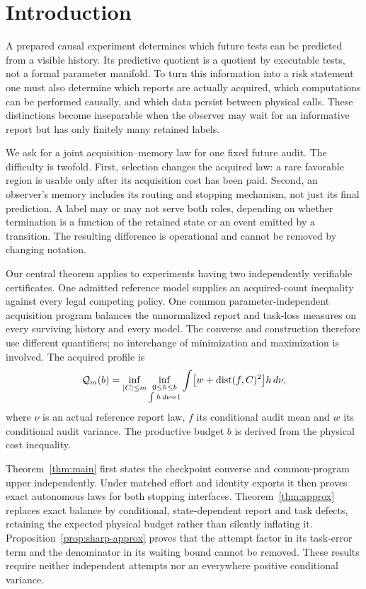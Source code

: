 \section{Introduction}
A prepared causal experiment determines which future tests can be predicted from a visible history. Its predictive quotient is a quotient by executable tests, not a formal parameter manifold. To turn this information into a risk statement one must also determine which reports are actually acquired, which computations can be performed causally, and which data persist between physical calls. These distinctions become inseparable when the observer may wait for an informative report but has only finitely many retained labels.

We ask for a joint acquisition--memory law for one fixed future audit. The difficulty is twofold. First, selection changes the acquired law: a rare favorable region is usable only after its acquisition cost has been paid. Second, an observer's memory includes its routing and stopping mechanism, not just its final prediction. A label may or may not serve both roles, depending on whether termination is a function of the retained state or an event emitted by a transition. The resulting difference is operational and cannot be removed by changing notation.

Our central theorem applies to experiments having two independently verifiable certificates. One admitted reference model supplies an acquired-count inequality against every legal competing policy. One common parameter-independent acquisition program balances the unnormalized report and task-loss measures on every surviving history and every model. The converse and construction therefore use different quantifiers; no interchange of minimization and maximization is involved. The acquired profile is
\[
 \mathcal Q_m(b)=\inf_{|C|\le m}\inf_{\substack{0\le h\le b\\\int h\,d\nu=1}}
       \int\bigl[w+\operatorname{dist}(f,C)^2\bigr]h\,d\nu,
\]
where $\nu$ is an actual reference report law, $f$ its conditional audit mean and $w$ its conditional audit variance. The productive budget $b$ is derived from the physical cost inequality.

Theorem~\ref{thm:main} first states the checkpoint converse and common-program upper independently. Under matched effort and identity exports it then proves exact autonomous laws for both stopping interfaces. Theorem~\ref{thm:approx} replaces exact balance by conditional, state-dependent report and task defects, retaining the expected physical budget rather than silently inflating it. Proposition~\ref{prop:sharp-approx} proves that the attempt factor in its task-error term and the denominator in its waiting bound cannot be removed. These results require neither independent attempts nor an everywhere positive conditional variance.

